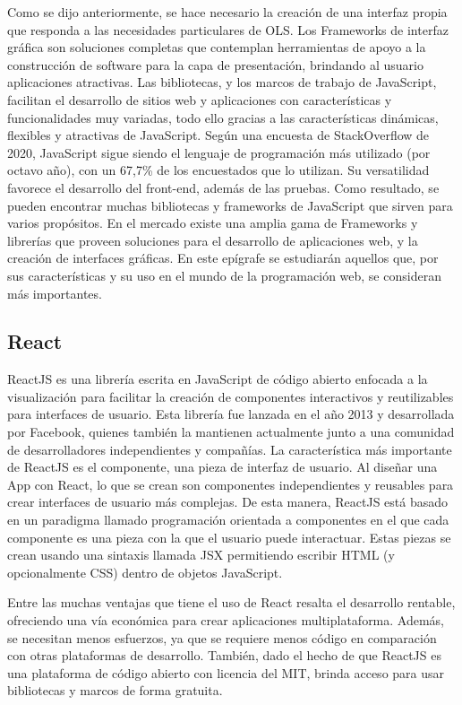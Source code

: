 Como se dijo anteriormente, se hace necesario la creaci\'on de una interfaz propia que responda a las necesidades particulares de OLS. Los Frameworks de interfaz gr\'afica son soluciones completas que contemplan herramientas de apoyo a la construcci\'on de software para la capa de presentaci\'on, brindando al usuario aplicaciones atractivas. Las bibliotecas, y los marcos de trabajo de JavaScript, facilitan el desarrollo de sitios web y aplicaciones con caracter\'isticas y funcionalidades muy variadas, todo ello gracias a las caracter\'isticas din\'amicas, flexibles y atractivas de JavaScript. Seg\'un una encuesta de StackOverflow de 2020, JavaScript sigue siendo el lenguaje de programaci\'on m\'as utilizado (por octavo a\~no), con un 67,7\% de los encuestados que lo utilizan. Su versatilidad favorece el desarrollo del front-end, adem\'as de las pruebas. Como resultado, se pueden encontrar muchas bibliotecas y frameworks de JavaScript que sirven para varios prop\'ositos. En el mercado existe una amplia gama de Frameworks y librer\'ias que proveen soluciones para el desarrollo de aplicaciones web, y la creaci\'on de interfaces gr\'aficas. En este ep\'igrafe se estudiar\'an aquellos que, por sus caracter\'isticas y su uso en el mundo de la programaci\'on web, se consideran m\'as importantes.


\subsection{React}
ReactJS es una librer\'ia escrita en JavaScript de c\'odigo abierto enfocada a la visualizaci\'on para facilitar la creaci\'on de componentes interactivos y reutilizables para interfaces de usuario. Esta librer\'ia fue lanzada en el a\~no 2013 y desarrollada por Facebook, quienes tambi\'en la mantienen actualmente junto a una comunidad de desarrolladores independientes y compa\~n\'ias. La caracter\'istica m\'as importante de ReactJS es el componente, una pieza de interfaz de usuario. Al dise\~nar una App con React, lo que se crean son componentes independientes y reusables para crear interfaces de usuario m\'as complejas. De esta manera, ReactJS est\'a basado en un paradigma llamado programaci\'on orientada a componentes en el que cada componente es una pieza con la que el usuario puede interactuar. Estas piezas se crean usando una sintaxis llamada JSX permitiendo escribir HTML (y opcionalmente CSS) dentro de objetos JavaScript.

Entre las muchas ventajas que tiene el uso de React resalta el desarrollo rentable, ofreciendo una v\'ia econ\'omica para crear aplicaciones multiplataforma. Adem\'as, se necesitan menos esfuerzos, ya que se requiere menos c\'odigo en comparaci\'on con otras plataformas de desarrollo. Tambi\'en, dado el hecho de que ReactJS es una plataforma de c\'odigo abierto con licencia del MIT, brinda acceso para usar bibliotecas y marcos de forma gratuita.


